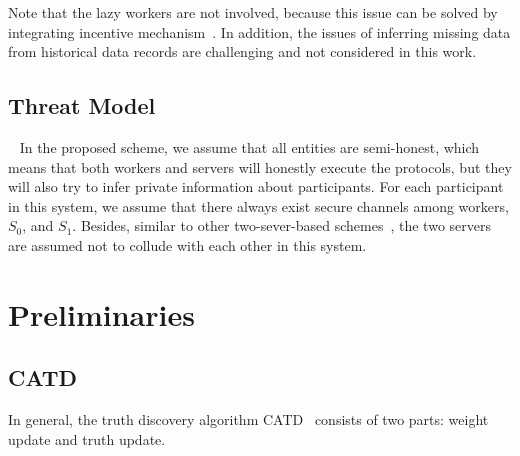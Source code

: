 \documentclass[conference]{IEEEtran}
\begin{document}
Note that the lazy workers are not involved, because this issue can be solved by integrating incentive mechanism~\cite{xue_inpptd_2020}.
In addition, the issues of inferring missing data from historical data records are challenging and not considered in this work.

\subsection{Threat Model}~\label{sub:threat}
In the proposed scheme, we assume that all entities are semi-honest, which means that both workers and servers will honestly execute the protocols, but they will also try to infer private information about participants.
For each participant in this system, we assume that there always exist secure channels among workers, $S_0$, and $S_1$.
Besides, similar to other two-sever-based schemes~\cite{miao_lightweight_2017,zhang_reliable_2019}, the two servers are assumed not to collude with each other in this system.


\section{Preliminaries}\label{sec4}
\subsection{CATD}
In general, the truth discovery algorithm CATD~\cite{li_confidence-aware_2014} consists of two parts: weight update and truth update.
\end{document}
